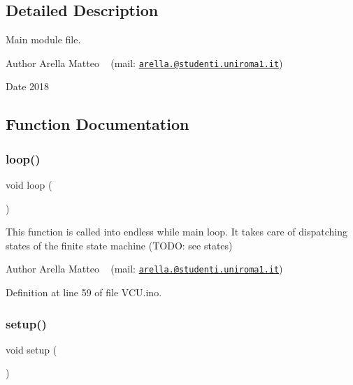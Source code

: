 \subsection{Detailed Description}
Main module file. 

\begin{DoxyAuthor}{Author}
Arella Matteo ~\newline
 (mail\+: \href{mailto:arella.1646983@studenti.uniroma1.it}{\tt arella.@studenti.\+uniroma1.\+it}) 
\end{DoxyAuthor}
\begin{DoxyDate}{Date}
2018 
\end{DoxyDate}


\subsection{Function Documentation}
\mbox{\label{_v_c_u_8ino_afe461d27b9c48d5921c00d521181f12f}} 
\subsubsection{\texorpdfstring{loop()}{loop()}}
{\footnotesize\ttfamily void loop (\begin{DoxyParamCaption}{ }\end{DoxyParamCaption})}



This function is called into endless while main loop. It takes care of dispatching states of the finite state machine (T\+O\+DO\+: see states) 

\begin{DoxyAuthor}{Author}
Arella Matteo ~\newline
 (mail\+: \href{mailto:arella.1646983@studenti.uniroma1.it}{\tt arella.@studenti.\+uniroma1.\+it}) 
\end{DoxyAuthor}


Definition at line 59 of file V\+C\+U.\+ino.

\mbox{\label{_v_c_u_8ino_a4fc01d736fe50cf5b977f755b675f11d}} 
\subsubsection{\texorpdfstring{setup()}{setup()}}
{\footnotesize\ttfamily void setup (\begin{DoxyParamCaption}{ }\end{DoxyParamCaption})}



